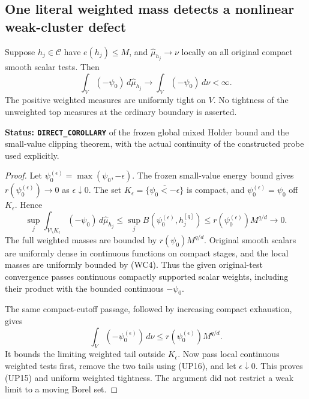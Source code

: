 \subsection{One literal weighted mass detects a nonlinear weak-cluster defect}

\begin{lemma}
\label{lem:r12-fixed-probe-weight-tightness}
Suppose $h_j\in\mathcal C$ have $e(h_j)\leq M$, and
$\widehat\mu_{h_j}\to\nu$ locally on all original compact smooth
scalar tests.  Then
\[
       \int_V(-\psi_0)\,d\widehat\mu_{h_j}
                      \longrightarrow\int_V(-\psi_0)\,d\nu<\infty.
 \tag{UP15}
\]
The positive weighted measures are uniformly tight on $V$.
No tightness of the unweighted top measures at the ordinary
boundary is asserted.
\end{lemma}

\noindent\textbf{Status: \texttt{DIRECT\_COROLLARY}} of the frozen
global mixed Holder bound and the small-value clipping theorem,
with the actual continuity of the constructed probe used explicitly.

\begin{proof}
Let $\psi_0^{(\epsilon)}=\max(\psi_0,-\epsilon)$.
The frozen small-value energy bound gives
$r(\psi_0^{(\epsilon)})\to0$ as $\epsilon\downarrow0$.
The set $K_\epsilon=\overline{\{\psi_0<-\epsilon\}}$ is compact,
and $\psi_0^{(\epsilon)}=\psi_0$ off $K_\epsilon$.  Hence
\[
 \sup_j\int_{V\setminus K_\epsilon}(-\psi_0)
                                     \,d\widehat\mu_{h_j}
 \leq\sup_j B(\psi_0^{(\epsilon)},h_j^{[q]})
 \leq r(\psi_0^{(\epsilon)})M^{q/d}\longrightarrow0.
 \tag{UP16}
\]
The full weighted masses are bounded by
$r(\psi_0)M^{q/d}$.  Original smooth scalars are uniformly dense
in continuous functions on compact stages, and the local masses
are uniformly bounded by (WC4).  Thus the given original-test
convergence passes continuous compactly supported scalar weights,
including their product with the bounded continuous $-\psi_0$.

The same compact-cutoff passage, followed by increasing compact
exhaustion, gives
\[
        \int_V(-\psi_0^{(\epsilon)})\,d\nu
                  \leq r(\psi_0^{(\epsilon)})M^{q/d}.
\]
It bounds the limiting weighted tail outside $K_\epsilon$.
Now pass local continuous weighted tests first, remove the two
tails using (UP16), and let $\epsilon\downarrow0$.  This proves
(UP15) and uniform weighted tightness.  The argument did not
restrict a weak limit to a moving Borel set.
\end{proof}

